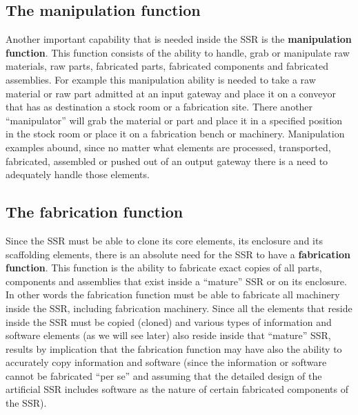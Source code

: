 \documentclass[letterpaper]{article}
\begin{document}
\bigskip

\subsection[The manipulation function]{The manipulation function}
\hypertarget{RefHeading3072306210128}{}Another important capability that
is needed inside the SSR is the \textbf{manipulation function}. This
function consists of the ability to handle, grab or manipulate raw
materials, raw parts, fabricated parts, fabricated components and
fabricated assemblies. For example this manipulation ability is needed
to take a raw material or raw part admitted at an input gateway and
place it on a conveyor that has as destination a stock room or a
fabrication site. There another “manipulator” will grab the material or
part and place it in a specified position in the stock room or place it
on a fabrication bench or machinery. Manipulation examples abound,
since no matter what elements are processed, transported, fabricated,
assembled or pushed out of an output gateway there is a need to
adequately handle those elements.


\bigskip

\subsection[The fabrication function]{The fabrication function}
\hypertarget{RefHeading3074306210128}{}Since the SSR must be able to
clone its core elements, its enclosure and its scaffolding elements,
there is an absolute need for the SSR to have a \textbf{fabrication
function}. This function is the ability to fabricate exact copies of
all parts, components and assemblies that exist inside a “mature” SSR
or on its enclosure. In other words the fabrication function must be
able to fabricate all machinery inside the SSR, including fabrication
machinery. Since all the elements that reside inside the SSR must be
copied (cloned) and various types of information and software elements
(as we will see later) also reside inside that “mature” SSR, results by
implication that the fabrication function may have also the ability to
accurately copy information and software (since the information or
software cannot be fabricated “per se” and assuming that the detailed
design of the artificial SSR includes software as the nature of certain
fabricated components of the SSR).


\bigskip
\end{document}
